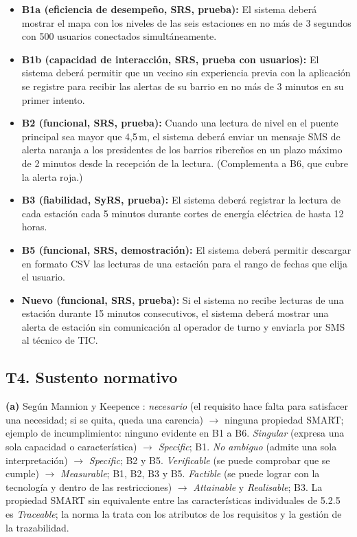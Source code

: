 \documentclass[11pt]{article}
\newcommand{\subseccion}[1]{\subsection{\textcolor{midblue}{#1}}}
\begin{document}
\begin{itemize}[leftmargin=18pt,itemsep=3pt]
	\item \textbf{B1a (eficiencia de desempeño, SRS, prueba):} El sistema deberá mostrar el mapa con los niveles de las seis estaciones en no más de 3 segundos con 500 usuarios conectados simultáneamente.
	\item \textbf{B1b (capacidad de interacción, SRS, prueba con usuarios):} El sistema deberá permitir que un vecino sin experiencia previa con la aplicación se registre para recibir las alertas de su barrio en no más de 3 minutos en su primer intento.
	\item \textbf{B2 (funcional, SRS, prueba):} Cuando una lectura de nivel en el puente principal sea mayor que 4,5\,m, el sistema deberá enviar un mensaje SMS de alerta naranja a los presidentes de los barrios ribereños en un plazo máximo de 2 minutos desde la recepción de la lectura. (Complementa a B6, que cubre la alerta roja.)
	\item \textbf{B3 (fiabilidad, SyRS, prueba):} El sistema deberá registrar la lectura de cada estación cada 5 minutos durante cortes de energía eléctrica de hasta 12 horas.
	\item \textbf{B5 (funcional, SRS, demostración):} El sistema deberá permitir descargar en formato CSV las lecturas de una estación para el rango de fechas que elija el usuario.
	\item \textbf{Nuevo (funcional, SRS, prueba):} Si el sistema no recibe lecturas de una estación durante 15 minutos consecutivos, el sistema deberá mostrar una alerta de estación sin comunicación al operador de turno y enviarla por SMS al técnico de TIC.
\end{itemize}

\subseccion{T4. Sustento normativo}

\textbf{(a)} Según Mannion y Keepence \citep{mannion_smart_1995}: \emph{necesario} (el requisito hace falta para satisfacer una necesidad; si se quita, queda una carencia) $\rightarrow$ ninguna propiedad SMART; ejemplo de incumplimiento: ninguno evidente en B1 a B6. \emph{Singular} (expresa una sola capacidad o característica) $\rightarrow$ \emph{Specific}; B1. \emph{No ambiguo} (admite una sola interpretación) $\rightarrow$ \emph{Specific}; B2 y B5. \emph{Verificable} (se puede comprobar que se cumple) $\rightarrow$ \emph{Measurable}; B1, B2, B3 y B5. \emph{Factible} (se puede lograr con la tecnología y dentro de las restricciones) $\rightarrow$ \emph{Attainable} y \emph{Realisable}; B3. La propiedad SMART sin equivalente entre las características individuales de 5.2.5 es \emph{Traceable}; la norma la trata con los atributos de los requisitos y la gestión de la trazabilidad.
\end{document}

